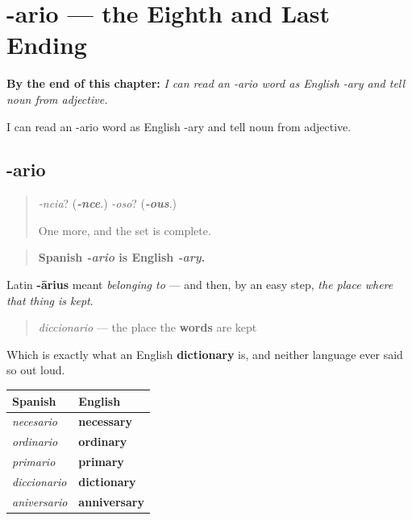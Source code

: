 
\chapter{-ario --- the Eighth and Last Ending}
\label{ch:ario}

\begin{chapteropening}
\textbf{By the end of this chapter:} \emph{I can read an -ario word as English -ary and tell noun from adjective.}

I can read an -ario word as English -ary and tell noun from adjective.
\end{chapteropening}

\section[-ario]{-ario}

\label{lesson:ES-C09-ario}



\begin{quote}
\emph{-ncia}? (\emph{\textbf{-nce}}.) \emph{-oso}? (\emph{\textbf{-ous}}.)

One more, and the set is complete.
\end{quote}

\begin{grammarlens}[title={Grammar Lens: belonging to, or the place for}]
\begin{quote}
\textbf{Spanish \emph{-ario} is English \emph{-ary}.}
\end{quote}

Latin \textbf{-ārius} meant \emph{belonging to} — and then, by an easy step, \emph{the place where that thing is kept}.

\begin{quote}
\emph{diccionario} — the place the \textbf{words} are kept
\end{quote}

Which is exactly what an English \textbf{dictionary} is, and neither language ever said so out loud.

\noindent
\begin{tabularx}{\linewidth}{@{}>{\raggedright\arraybackslash}X>{\raggedright\arraybackslash}X@{}}
\toprule
\textbf{Spanish} & \textbf{English} \\
\midrule
\emph{necesario} & \textbf{necessary} \\
\emph{ordinario} & \textbf{ordinary} \\
\emph{primario} & \textbf{primary} \\
\emph{diccionario} & \textbf{dictionary} \\
\emph{aniversario} & \textbf{anniversary} \\
\bottomrule
\end{tabularx}
\end{grammarlens}

